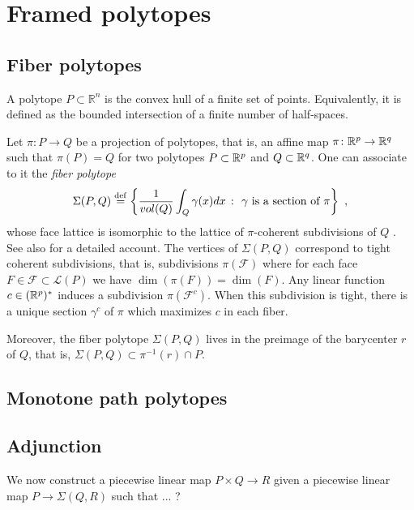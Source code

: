 
\section{Framed polytopes}


\subsection{Fiber polytopes}

A polytope $P \subset \mathbb{R}^n$ is the convex hull of a finite set of points.
Equivalently, it is defined as the bounded intersection of a finite number of half-spaces.

Let $\pi \colon P \to Q$ be a projection of polytopes, that is, an affine map $\pi \colon \mathbb{R}^p \to \mathbb{R}^q$ such that $\pi(P)=Q$ for two polytopes $P\subset \mathbb{R}^p$ and $Q \subset \mathbb{R}^q$.
One can associate to it the \emph{fiber polytope} \[\Sigma(P,Q) \stackrel{\mathrm{def}}{=} \left\{ \frac{1}{vol(Q)}\int_Q \gamma(x)dx \ \colon \ \gamma \text{ is a section of }\pi \right\} \ , \] whose face lattice is isomorphic to the lattice of $\pi$-coherent subdivisions of $Q$ \cite{BilleraSturmfels92}.
See also \cite[Chapter 9]{Ziegler95} for a detailed account.
The vertices of $\Sigma(P,Q)$ correspond to tight coherent subdivisions, that is, subdivisions $\pi(\mathcal{F})$ where for each face $F \in \mathcal{F}\subset\mathcal{L}(P)$ we have $\dim(\pi(F))=\dim(F)$.
Any linear function $c\in (\mathbb{R}^p)^{*}$ induces a subdivision $\pi(\mathcal{F}^c)$.
When this subdivision is tight, there is a unique section $\gamma^c$ of $\pi$ which maximizes $c$ in each fiber.

Moreover, the fiber polytope $\Sigma(P,Q)$ lives in the preimage of the barycenter $r$ of $Q$, that is, $\Sigma(P,Q)\subset\pi^{-1}(r)\cap P$.

\subsection{Monotone path polytopes}


\subsection{Adjunction}

We now construct a piecewise linear map $P  \times Q \to R$ given a piecewise linear map $P \to \Sigma(Q,R)$ such that ... ?

